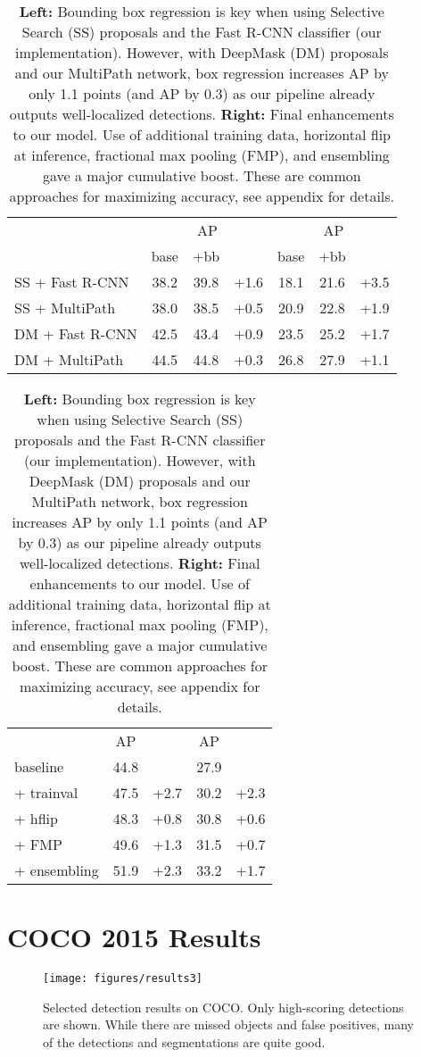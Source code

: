\documentclass{bmvc2k}
\newcommand{\Caption}[1]{\caption{\small#1}}
\newcommand{\AP}[1]{AP\xspace}
\begin{document}
\begin{table}[t]\centering\scriptsize
\renewcommand\arraystretch{1.1}\renewcommand{\tabcolsep}{1.8mm}
\begin{tabular}[t]{ l | c c c | c c c}
 &  \multicolumn{3}{c|}{\AP{50}} & \multicolumn{3}{c}{AP} \\
 & base & +bb &  & base & +bb &  \\
 \shline
 SS + Fast R-CNN & 38.2 & 39.8 & +1.6 & 18.1 & 21.6 & +3.5\\
 SS + MultiPath  & 38.0 & 38.5 & +0.5 & 20.9 & 22.8 & +1.9\\
 \hline
 DM + Fast R-CNN & 42.5 & 43.4 & +0.9 & 23.5 & 25.2 & +1.7\\
 DM + MultiPath  & 44.5 & 44.8 & +0.3 & 26.8 & 27.9 & +1.1\\
\end{tabular}\hspace{6mm}
\begin{tabular}[t]{ l | c c | c c}
  & \AP{50} &  & AP &  \\
 \shline
  baseline            & 44.8 &      & 27.9 &  \\
  + trainval   & 47.5 & +2.7 & 30.2 & +2.3 \\
  + hflip      & 48.3 & +0.8 & 30.8 & +0.6 \\
  + FMP        & 49.6 & +1.3 & 31.5 & +0.7 \\
  + ensembling & 51.9 & +2.3 & 33.2 & +1.7 \\
\end{tabular}
\Caption{\textbf{Left:} Bounding box regression is key when using Selective Search (SS) proposals and the Fast R-CNN classifier (our implementation). However, with DeepMask (DM) proposals and our MultiPath network, box regression increases AP by only 1.1 points (and \AP{50} by 0.3) as our pipeline already outputs well-localized detections. \textbf{Right:} Final enhancements to our model. Use of additional training data, horizontal flip at inference, fractional max pooling (FMP), and ensembling gave a major cumulative boost. These are common approaches for maximizing accuracy, see appendix for details.}
\label{table:improvements}
\end{table}


\section{COCO 2015 Results}\label{sec:competition}

\begin{figure}[t]\centering
 \texttt{[image: figures/results3]}
\Caption{Selected detection results on COCO. Only high-scoring detections are shown. While there are missed objects and false positives, many of the detections and segmentations are quite good.}
\label{fig:results3}
\end{figure}
\end{document}
